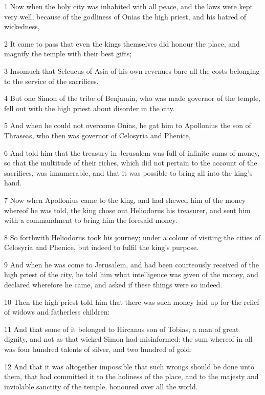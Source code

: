 \par 1 Now when the holy city was inhabited with all peace, and the laws were kept very well, because of the godliness of Onias the high priest, and his hatred of wickedness,
\par 2 It came to pass that even the kings themselves did honour the place, and magnify the temple with their best gifts;
\par 3 Insomuch that Seleucus of Asia of his own revenues bare all the costs belonging to the service of the sacrifices.
\par 4 But one Simon of the tribe of Benjamin, who was made governor of the temple, fell out with the high priest about disorder in the city.
\par 5 And when he could not overcome Onias, he gat him to Apollonius the son of Thraseas, who then was governor of Celosyria and Phenice,
\par 6 And told him that the treasury in Jerusalem was full of infinite sums of money, so that the multitude of their riches, which did not pertain to the account of the sacrifices, was innumerable, and that it was possible to bring all into the king's hand.
\par 7 Now when Apollonius came to the king, and had shewed him of the money whereof he was told, the king chose out Heliodorus his treasurer, and sent him with a commandment to bring him the foresaid money.
\par 8 So forthwith Heliodorus took his journey; under a colour of visiting the cities of Celosyria and Phenice, but indeed to fulfil the king's purpose.
\par 9 And when he was come to Jerusalem, and had been courteously received of the high priest of the city, he told him what intelligence was given of the money, and declared wherefore he came, and asked if these things were so indeed.
\par 10 Then the high priest told him that there was such money laid up for the relief of widows and fatherless children:
\par 11 And that some of it belonged to Hircanus son of Tobias, a man of great dignity, and not as that wicked Simon had misinformed: the sum whereof in all was four hundred talents of silver, and two hundred of gold:
\par 12 And that it was altogether impossible that such wrongs should be done unto them, that had committed it to the holiness of the place, and to the majesty and inviolable sanctity of the temple, honoured over all the world.
